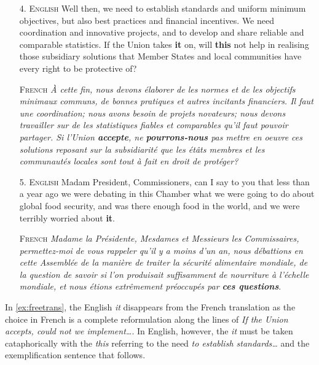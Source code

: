 \documentclass[10pt, a4paper]{article}
\begin{document}
\begin{enumerate}

\item[4.]\label{ex:freetrans} 
\textsc{English} Well then, we need to establish standards and uniform minimum 
objectives, but also best practices and financial incentives. We need 
coordination and innovative projects, and to develop and share reliable and 
comparable statistics. If the Union takes \textbf{it} on, will \textbf{this} not help in 
realising those subsidiary solutions that Member States and local communities 
have every right to be protective of? 

\textsc{French} \textit{À cette fin, nous devons élaborer de les normes et de 
les 
objectifs minimaux communs, de bonnes pratiques et autres incitants financiers. 
Il faut une coordination; nous avons besoin de projets novateurs; nous devons 
travailler sur de les statistiques fiables et comparables qu'il faut pouvoir 
partager. Si l'Union \textbf{accepte}, ne \textbf{pourrons-nous} pas mettre en oeuvre ces 
solutions reposant sur la subsidiarité que les étâts membres et les communautés 
locales sont tout à fait en droit de protéger?}


\item[5.]\label{ex:shellnoun}\textsc{English} Madam President, Commissioners, 
can I 
say to you that less than 
a year ago we were debating in this Chamber what we were going to do about 
global food security, and was there enough food in the world, and we were 
terribly worried about \textbf{it}.

\textsc{French} \textit{Madame la Présidente, Mesdames et Messieurs les 
Commissaires, permettez-moi de vous rappeler qu'il y a moins d'un an, nous 
débattions en cette Assemblée de la manière de traiter la sécurité alimentaire 
mondiale, de la question de savoir si l'on produisait suffisamment de 
nourriture à l'échelle mondiale, et nous étions extrêmement préoccupés par 
\textbf{ces questions}}.

\end{enumerate}

In \ref{ex:freetrans}, the English \textit{it} disappears from the 
French translation as the choice in French is a complete reformulation along the 
lines of \textit{If the Union accepts, could not we implement\ldots}. In 
English, however, the \textit{it} must be taken cataphorically with the 
\textit{this} referring to the need \textit{to establish standards\ldots} and 
the exemplification sentence that follows. 
\end{document}
